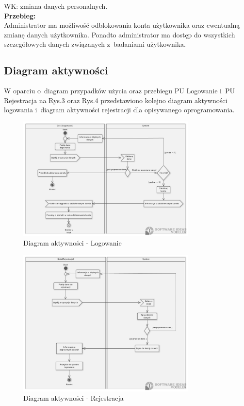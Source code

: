 \documentclass[12pt, letterpaper]{article}
\begin{document}
		WK: zmiana danych personalnych.\\
		
		\textbf{Przebieg:}\\
		Administrator ma możliwość odblokowania konta użytkownika oraz ewentualną zmianę danych użytkownika. Ponadto administrator ma dostęp do wszystkich szczegółowych danych związanych z~badaniami użytkownika.
		 \\
		

		

		\subsection{Diagram aktywności}
		
		W oparciu o~diagram przypadków użycia oraz przebiegu PU Logowanie i~PU Rejestracja na Rys.3 oraz Rys.4 przedstawiono kolejno diagram aktywności logowania i~diagram aktywności rejestracji dla opisywanego oprogramowania.
		
\begin{figure}[h]
  \centering
      \includegraphics[width=0.8\textwidth]{aclogowanie}
  \caption{Diagram aktywności - Logowanie}
\end{figure}

\begin{figure}[h]
  \centering
      \includegraphics[width=0.8\textwidth]{acrejestracja}
  \caption{Diagram aktywności - Rejestracja}
\end{figure}
		
\end{document}
